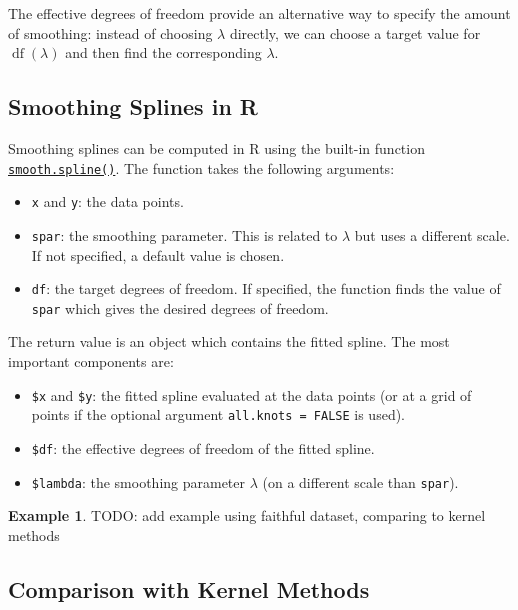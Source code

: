 \documentclass[
  a4paper,
]{article}
\providecommand{\tightlist}{%
  \setlength{\itemsep}{0pt}\setlength{\parskip}{0pt}}
\theoremstyle{definition}
\theoremstyle{definition}
\newtheorem{example}{Example}[section]
\theoremstyle{definition}
\theoremstyle{definition}
\theoremstyle{remark}
\begin{document}
The effective degrees of freedom provide an alternative way to specify
the amount of smoothing: instead of choosing \(\lambda\) directly, we can
choose a target value for \(\mathop{\mathrm{df}}\nolimits(\lambda)\) and then find the corresponding
\(\lambda\).

\subsection{Smoothing Splines in R}\label{smoothing-splines-in-r}

Smoothing splines can be computed in R using the built-in function
\href{https://rdrr.io/r/stats/smooth.spline.html}{\texttt{smooth.spline()}}. The
function takes the following arguments:

\begin{itemize}
\tightlist
\item
  \texttt{x} and \texttt{y}: the data points.
\item
  \texttt{spar}: the smoothing parameter. This is related to \(\lambda\) but uses
  a different scale. If not specified, a default value is chosen.
\item
  \texttt{df}: the target degrees of freedom. If specified, the function finds
  the value of \texttt{spar} which gives the desired degrees of freedom.
\end{itemize}

The return value is an object which contains the fitted spline. The most
important components are:

\begin{itemize}
\tightlist
\item
  \texttt{\$x} and \texttt{\$y}: the fitted spline evaluated at the data points (or at a
  grid of points if the optional argument \texttt{all.knots\ =\ FALSE} is used).
\item
  \texttt{\$df}: the effective degrees of freedom of the fitted spline.
\item
  \texttt{\$lambda}: the smoothing parameter \(\lambda\) (on a different scale than
  \texttt{spar}).
\end{itemize}

\begin{example}
TODO: add example using faithful dataset, comparing to kernel methods
\end{example}

\subsection{Comparison with Kernel Methods}\label{comparison-with-kernel-methods}
\end{document}
